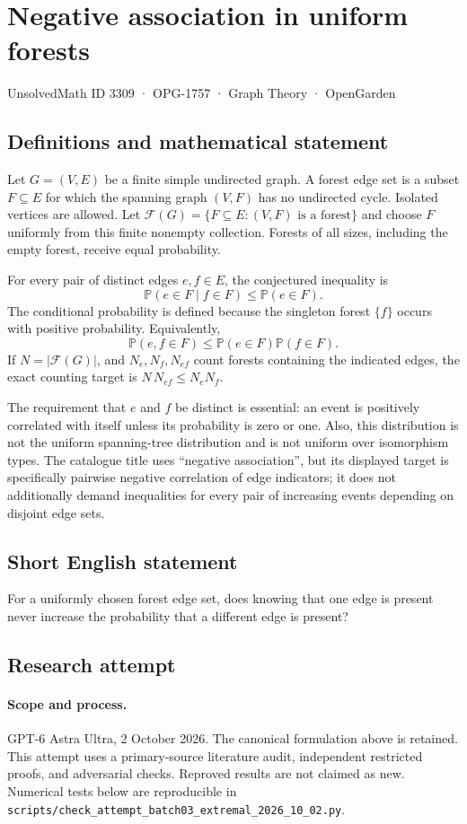 \documentclass[11pt,a4paper]{article}
\begin{document}
\section*{Negative association in uniform forests}\label{3309}
{\small UnsolvedMath ID 3309 · OPG-1757 · Graph Theory · OpenGarden}
\subsection{Definitions and mathematical statement}
Let $G=(V,E)$ be a finite simple undirected graph. A forest edge set
is a subset $F\subseteq E$ for which the spanning graph $(V,F)$ has
no undirected cycle. Isolated vertices are allowed. Let
$\mathcal F(G)=\{F\subseteq E:(V,F)\text{ is a forest}\}$ and choose
$F$ uniformly from this finite nonempty collection. Forests of all
sizes, including the empty forest, receive equal probability.

For every pair of distinct edges $e,f\in E$, the conjectured inequality
is
\[
                  \mathbb P(e\in F\mid f\in F)
                              \le\mathbb P(e\in F).
\]
The conditional probability is defined because the singleton forest
$\{f\}$ occurs with positive probability. Equivalently,
\[
            \mathbb P(e,f\in F)\le
                         \mathbb P(e\in F)\mathbb P(f\in F).
\]
If $N=|\mathcal F(G)|$, and $N_e,N_f,N_{ef}$ count forests containing
the indicated edges, the exact counting target is
$N\,N_{ef}\le N_eN_f$.

The requirement that $e$ and $f$ be distinct is essential: an event is
positively correlated with itself unless its probability is zero or
one. Also, this distribution is not the uniform spanning-tree
distribution and is not uniform over isomorphism types. The catalogue
title uses ``negative association'', but its displayed target is
specifically pairwise negative correlation of edge indicators; it
does not additionally demand inequalities for every pair of increasing
events depending on disjoint edge sets.
\subsection{Short English statement}
For a uniformly chosen forest edge set, does knowing that one edge is present never increase the probability that a different edge is present?
\subsection{Research attempt}
\paragraph{Scope and process.}
GPT-6 Astra Ultra, 2 October 2026. The canonical formulation above is retained. This attempt uses a primary-source literature audit, independent restricted proofs, and adversarial checks. Reproved results are not claimed as new. Numerical tests below are reproducible in \texttt{scripts/check\_attempt\_batch03\_extremal\_2026\_10\_02.py}.
\end{document}
